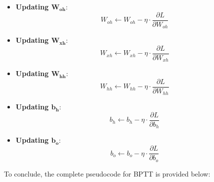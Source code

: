 \begin{itemize}
\item \textbf{Updating $\boldsymbol{W_{oh}}$}: 
$$
W_{oh} \leftarrow W_{oh} -\eta \cdot \frac{\partial L}{\partial W_{oh}}
$$

\item \textbf{Updating $\boldsymbol{W_{xh}}$}: 
$$
W_{xh} \leftarrow W_{xh} -\eta \cdot \frac{\partial L}{\partial W_{xh}}
$$

\item \textbf{Updating $\boldsymbol{W_{hh}}$}: 
$$
W_{hh} \leftarrow W_{hh} -\eta \cdot \frac{\partial L}{\partial W_{hh}}
$$

\item \textbf{Updating $\boldsymbol{b_{h}}$}: 
$$
b_{h} \leftarrow b_{h} -\eta \cdot \frac{\partial L}{\partial b_{h}}
$$

\item \textbf{Updating $\boldsymbol{b_{o}}$}: 
$$
b_{o} \leftarrow b_{o} -\eta \cdot \frac{\partial L}{\partial b_{o}}
$$


\end{itemize}

To conclude, the complete pseudocode for BPTT is provided below:

